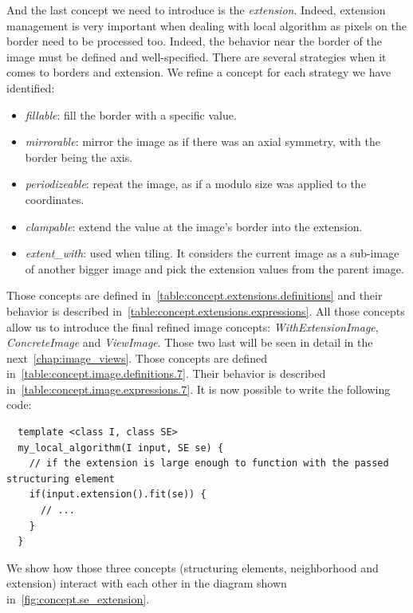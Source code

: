 And the last concept we need to introduce is the \emph{extension}. Indeed, extension management is very important when
dealing with local algorithm as pixels on the border need to be processed too. Indeed, the behavior near the border of
the image must be defined and well-specified. There are several strategies when it comes to borders and extension. We
refine a concept for each strategy we have identified:
\begin{itemize}
  \item \emph{fillable}: fill the border with a specific value.
  \item \emph{mirrorable}: mirror the image as if there was an axial symmetry, with the border being the axis.
  \item \emph{periodizeable}: repeat the image, as if a modulo size was applied to the coordinates.
  \item \emph{clampable}: extend the value at the image's border into the extension.
  \item \emph{extent\_with}: used when tiling. It considers the current image as a sub-image of another bigger image and
        pick the extension values from the parent image.
\end{itemize}
Those concepts are defined in~\cref{table:concept.extensions.definitions} and their behavior is described
in~\cref{table:concept.extensions.expressions}. All those concepts allow us to introduce the final refined image
concepts: \emph{WithExtensionImage}, \emph{ConcreteImage} and \emph{ViewImage}. Those two last will be seen in
detail in the next~\cref{chap:image_views}. Those concepts are defined in~\cref{table:concept.image.definitions.7}.
Their behavior is described in~\cref{table:concept.image.expressions.7}. It is now possible to write the following code:
\begin{verbatim}
  template <class I, class SE>
  my_local_algorithm(I input, SE se) {
    // if the extension is large enough to function with the passed structuring element
    if(input.extension().fit(se)) {
      // ...
    }
  }
\end{verbatim}

We show how those three concepts (structuring elements, neighborhood and extension) interact with each other in the
diagram shown in~\cref{fig:concept.se_extension}.

